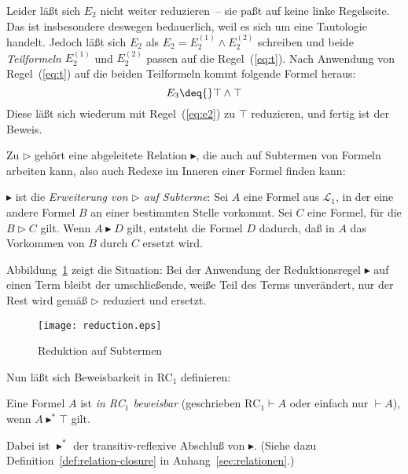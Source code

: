 Leider läßt sich $E_2$ nicht weiter reduzieren~-- sie paßt auf
keine linke Regelseite.  Das ist insbesondere deswegen bedauerlich, weil es sich
um eine Tautologie handelt.  Jedoch läßt sich $E_2$ als $E_2 = E_2^{(1)} \wedge
E_2^{(2)}$ schreiben und beide \textit{Teilformeln} $E_2^{(1)}$ und $E_2^{(2)}$
passen auf die Regel~(\ref{eq:t}).  Nach Anwendung von Regel~(\ref{eq:t}) auf die beiden
Teilformeln kommt folgende Formel heraus:
%
  \begin{displaymath}
    E_3 \deq{} \top \wedge \top
  \end{displaymath}
%
  Diese läßt sich wiederum mit Regel~(\ref{eq:e2}) zu $\top$ reduzieren,
  und fertig ist der Beweis.

Zu $\triangleright$ gehört eine abgeleitete
Relation $\blacktriangleright$, die auch auf
Subtermen von Formeln arbeiten kann, also auch Redexe im Inneren einer Formel
finden kann:
%
\begin{definition}
  $\blacktriangleright$ ist die \textit{Erweiterung von $\triangleright$ auf
    Subterme}: Sei $A$ eine Formel aus $\mathcal{L}_1$, in der eine andere
  Formel $B$ an einer bestimmten Stelle vorkommt.  Sei $C$ eine Formel, für die
  $B\triangleright C$ gilt.  Wenn
  $A\blacktriangleright D$ gilt, entsteht die Formel $D$ dadurch, daß in $A$
  das Vorkommen von $B$ durch $C$ ersetzt wird.  
\end{definition}
%
Abbildung~\ref{fig:reduction} zeigt die Situation: Bei der Anwendung
der Reduktionsregel $\blacktriangleright$ auf einen Term bleibt der
umschließende, weiße Teil des Terms unverändert, nur der Rest wird
gemäß $\triangleright$ reduziert und ersetzt.

\begin{figure}[tb]
  \begin{center}
    {
      \texttt{[image: reduction.eps]}
      }
    \caption{Reduktion auf Subtermen}
    \label{fig:reduction}
  \end{center}
\end{figure}


Nun läßt sich Beweisbarkeit in RC$_1$ definieren:
%
\begin{definition}[Beweisbarkeit in RC$_1$]
  Eine Formel $A$ ist \textit{in RC$_1$ beweisbar} (geschrieben
  $\mathrm{RC}_1 \vdash A$ oder einfach nur $\vdash A$), wenn
  $A\blacktriangleright^\ast\top$ gilt.
\end{definition}
%
Dabei ist $\blacktriangleright^\ast$ der
transitiv-reflexive Abschluß von $\blacktriangleright$.  (Siehe dazu
  Definition~\ref{def:relation-closure} in
  Anhang~\ref{sec:relationen}.)

